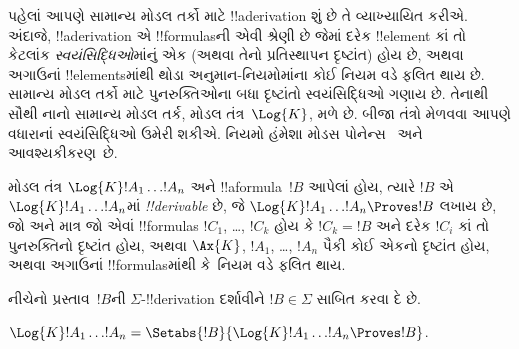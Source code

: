 \documentclass[../../../include/open-logic-section]{subfiles}
\begin{document}


પહેલાં આપણે સામાન્ય મોડલ તર્કો માટે !!a{derivation} શું છે તે
વ્યાખ્યાયિત કરીએ. અંદાજે, !!a{derivation} એ !!{formula}sની એવી શ્રેણી છે
જેમાં દરેક !!{element} કાં તો કેટલાંક \emph{સ્વયંસિદ્ધિઓ}માંનું એક
(અથવા તેનો પ્રતિસ્થાપન દૃષ્ટાંત) હોય છે, અથવા અગાઉનાં !!{element}sમાંથી
થોડા અનુમાન-નિયમોમાંના કોઈ નિયમ વડે ફલિત થાય છે. સામાન્ય મોડલ તર્કો
માટે પુનરુક્તિઓના બધા દૃષ્ટાંતો
સ્વયંસિદ્ધિઓ ગણાય છે. તેનાથી સૌથી નાનો સામાન્ય મોડલ તર્ક, મોડલ
તંત્ર~$\Log{K}$, મળે છે. બીજા તંત્રો મેળવવા આપણે વધારાનાં
સ્વયંસિદ્ધિઓ ઉમેરી શકીએ. નિયમો હંમેશા મોડસ પોનેન્સ~\MP{} અને
આવશ્યકીકરણ~\Nec છે.

\begin{defn}
  મોડલ તંત્ર $\Log{K} !A_1 \dots !A_n$ અને !!a{formula}~$!B$ આપેલાં
  હોય, ત્યારે $!B$ એ $\Log{K} !A_1 \dots
  !A_n$માં \emph{!!{derivable}} છે, જે
  $\Log{K} !A_1 \dots !A_n \Proves !B$ લખાય છે, જો અને માત્ર જો
  એવાં !!{formula}s $!C_1$, \dots, $!C_k$ હોય કે $!C_k = !B$ અને દરેક
  $!C_i$ કાં તો પુનરુક્તિનો દૃષ્ટાંત હોય, અથવા
  $\Ax{K}$, $!A_1$,
  \dots, $!A_n$ પૈકી કોઈ એકનો દૃષ્ટાંત હોય, અથવા અગાઉનાં
  !!{formula}sમાંથી \MP{} કે~\Nec નિયમ વડે ફલિત થાય.
\end{defn}

નીચેનો પ્રસ્તાવ~$!B$ની $\Sigma$-!!{derivation} દર્શાવીને
$!B \in \Sigma$ સાબિત કરવા દે છે.

\begin{prop}
  $\Log{K} !A_1 \dots !A_n = \Setabs{!B}{\Log{K} !A_1 \dots !A_n \Proves !B}$.
\end{prop}
\end{document}
